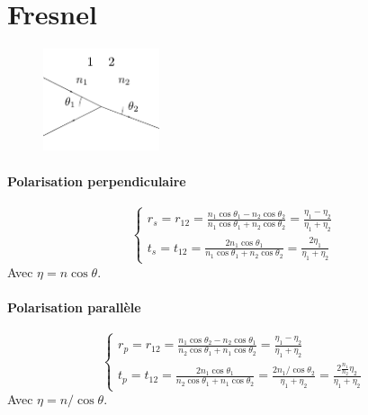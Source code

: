 \documentclass[a4paper,english]{article}
\begin{document}
\section{Fresnel}


\begin{figure}[H]
	\centering
	\includegraphics[height=3cm]{fresnel.pdf}
\end{figure}

\paragraph{Polarisation perpendiculaire}
\begin{equation}
\left\{ \begin{array}{l} 
r_s = r_{12} = \frac{n_1 \cos \theta_1 - n_2 \cos \theta_2}{n_1 \cos \theta_1 + n_2 \cos \theta_2} = \frac{\eta_1 - \eta_2}{\eta_1 + \eta_2} \\
t_s = t_{12} = \frac{2 n_1 \cos \theta_1}{n_1 \cos \theta_1 + n_2 \cos \theta_2} = \frac{2 \eta_1}{\eta_1 + \eta_2}
\end{array} \right.
\end{equation}
Avec $\eta = n \cos \theta$.

\paragraph{Polarisation parallèle}
\begin{equation}
\left\{ \begin{array}{l} 
r_p = r_{12} = \frac{n_1 \cos \theta_2 - n_2 \cos \theta_1}{n_2 \cos \theta_1 + n_1 \cos \theta_2} = \frac{\eta_1 - \eta_2}{\eta_1 + \eta_2} \\
t_p = t_{12} = \frac{2 n_1 \cos \theta_1}{n_2 \cos \theta_1 + n_1 \cos \theta_2} = \frac{2 n_1 / \cos \theta_2}{\eta_1 + \eta_2} = \frac{2 \frac{n_1}{n_2} \eta_2}{\eta_1 + \eta_2}
\end{array} \right.
\end{equation}
Avec $\eta = n / \cos \theta$.
\end{document}
